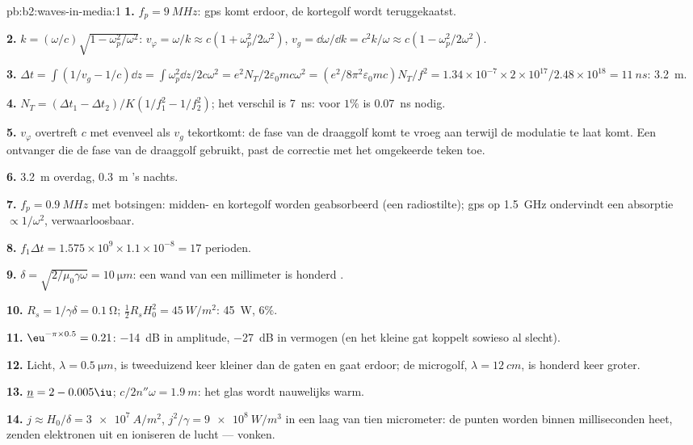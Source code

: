 \begin{solution}{pb:b2:waves-in-media:1}
\textbf{1.} $f_p = \qty{9}{MHz}$: gps komt erdoor, de kortegolf wordt teruggekaatst.

\textbf{2.} $k = (\omega/c)\sqrt{1 - \omega_p^2/\omega^2}$:
$v_\varphi = \omega/k \approx c(1 + \omega_p^2/
2\omega^2)$,
$v_g = \dd\omega/\dd k = c^2k/\omega \approx c(1 - \omega_p^2/2\omega^2)$.

\textbf{3.}
$\Delta t = \int(1/v_g - 1/c)\dd z = \int\omega_p^2\dd z/2c\omega^2 = e^2N_T/2\varepsilon_0
mc\omega^2 = (e^2/8\pi^2\varepsilon_0mc)N_T/f^2 = 1.34 \times 10^{-7} \times 2 \times 10^{17}/2.48 \times
10^{18} = \qty{11}{ns}$:
\qty{3.2}{m}.

\textbf{4.} $N_T = (\Delta t_1 - \Delta t_2)/K(1/f_1^2 - 1/f_2^2)$; het
verschil is \qty{7}{ns}: voor $1\%$ is \qty{0.07}{ns} nodig.

\textbf{5.} $v_\varphi$ overtreft $c$ met evenveel als $v_g$ tekortkomt: de
fase van de draaggolf komt te vroeg aan terwijl de modulatie te laat komt.
Een ontvanger die de fase van de draaggolf gebruikt, past de correctie met
het omgekeerde teken toe.

\textbf{6.} \qty{3.2}{m} overdag, \qty{0.3}{m} 's nachts.

\textbf{7.} $f_p = \qty{0.9}{MHz}$ met botsingen: midden- en kortegolf
worden geabsorbeerd (een radiostilte); gps op \qty{1.5}{GHz} ondervindt een
absorptie $\propto 1/\omega^2$, verwaarloosbaar.

\textbf{8.} $f_1\Delta t = 1.575 \times 10^9 \times 1.1 \times 10^{-8} = 17$
perioden.

\textbf{9.} $\delta = \sqrt{2/\mu_0\gamma\omega} = \qty{10}{\micro m}$: een
wand van een millimeter is honderd .

\textbf{10.} $R_s = 1/\gamma\delta = \qty{0.1}{\ohm}$;
$\tfrac12R_sH_0^2 = \qty{45}{W/m^2}$: \qty{45}{W}, $6\%$.

\textbf{11.} $\eu^{-\pi \times 0.5} = 0.21$: \qty{-14}{dB} in amplitude,
\qty{-27}{dB} in vermogen (en het kleine gat koppelt sowieso al slecht).

\textbf{12.} Licht, $\lambda = \qty{0.5}{\micro m}$, is tweeduizend keer
kleiner dan de gaten en gaat erdoor; de microgolf, $\lambda = \qty{12}{cm}$,
is honderd keer groter.

\textbf{13.} $\underline n = 2 - 0.005\iu$; $c/2n''\omega = \qty{1.9}{m}$:
het glas wordt nauwelijks warm.

\textbf{14.} $j \approx H_0/\delta = \qty{3e7}{A/m^2}$,
$j^2/\gamma = \qty{9e8}{W/m^3}$ in een laag van tien micrometer: de punten
worden binnen milliseconden heet, zenden elektronen uit en ioniseren de
lucht --- vonken.


\end{solution}
